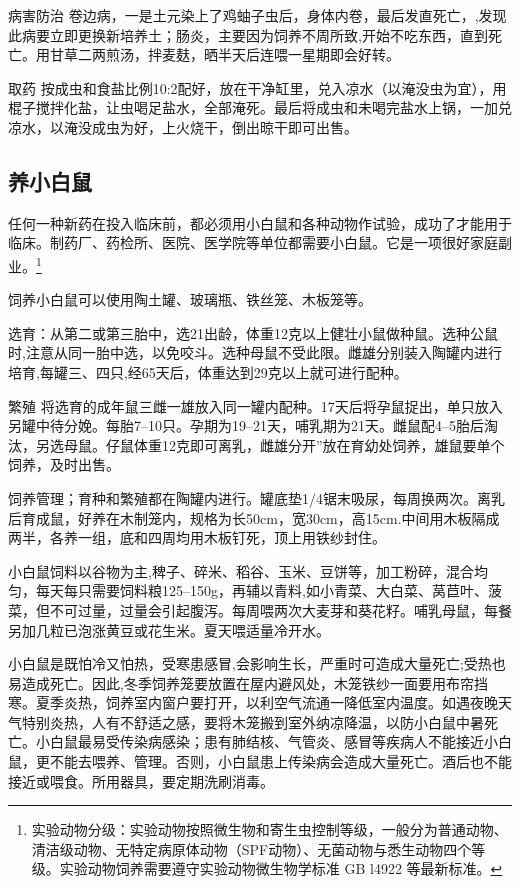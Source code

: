 \documentclass{ctexbook}
\begin{document}
病害防治 卷边病，一是土元染上了鸡蚰子虫后，身体内卷，最后发直死亡，,发现此病要立即更换新培养土；肠炎，主要因为饲养不周所致,开始不吃东西，直到死亡。用甘草二两煎汤，拌麦麸，晒半天后连喂一星期即会好转。

取药 按成虫和食盐比例10:2配好，放在干净缸里，兑入凉水（以淹没虫为宜），用棍子搅拌化盐，让虫喝足盐水，全部淹死。最后将成虫和未喝完盐水上锅，一加兑凉水，以淹没成虫为好，上火烧干，倒出晾干即可出售。
\subsection{养小白鼠}
任何一种新药在投入临床前，都必须用小白鼠和各种动物作试验，成功了才能用于临床。制药厂、药检所、医院、医学院等单位都需要小白鼠。它是一项很好家庭副业。\footnote{实验动物分级：实验动物按照微生物和寄生虫控制等级，一般分为普通动物、清洁级动物、无特定病原体动物（SPF动物）、无菌动物与悉生动物四个等级。实验动物饲养需要遵守实验动物微生物学标准 GB l4922 等最新标准。}

饲养小白鼠可以使用陶土罐、玻璃瓶、铁丝笼、木板笼等。

选育：从第二或第三胎中，选21出龄，体重12克以上健壮小鼠做种鼠。选种公鼠时,注意从同一胎中选，以免咬斗。选种母鼠不受此限。雌雄分别装入陶罐内进行培育,每罐三、四只,经65天后，体重达到29克以上就可进行配种。

繁殖 将选育的成年鼠三雌一雄放入同一罐内配种。17天后将孕鼠捉出，单只放入另罐中待分娩。每胎7--10只。孕期为19--21天，哺乳期为21天。雌鼠配4--5胎后淘汰，另选母鼠。仔鼠体重12克即可离乳，雌雄分开”放在育幼处饲养，雄鼠要单个饲养，及时出售。

饲养管理；育种和繁殖都在陶罐内进行。罐底垫1/4锯末吸尿，每周换两次。离乳后育成鼠，好养在木制笼内，规格为长50cm，宽30cm，高15cm.中间用木板隔成两半，各养一组，底和四周均用木板钉死，顶上用铁纱封住。

小白鼠饲料以谷物为主,稗子、碎米、稻谷、玉米、豆饼等，加工粉碎，混合均匀，每天每只需要饲料粮125--150g，再辅以青料,如小青菜、大白菜、莴苣叶、菠菜，但不可过量，过量会引起腹泻。每周喂两次大麦芽和葵花籽。哺乳母鼠，每餐另加几粒已泡涨黄豆或花生米。夏天喂适量冷开水。

小白鼠是既怕冷又怕热，受寒患感冒,会影响生长，严重时可造成大量死亡;受热也易造成死亡。因此,冬季饲养笼要放置在屋内避风处，木笼铁纱一面要用布帘挡寒。夏季炎热，饲养室内窗户要打开，以利空气流通一降低室内温度。如遇夜晚天气特别炎热，人有不舒适之感，要将木笼搬到室外纳凉降温，以防小白鼠中暑死亡。小白鼠最易受传染病感染；患有肺结核、气管炎、感冒等疾病人不能接近小白鼠，更不能去喂养、管理。否则，小白鼠患上传染病会造成大量死亡。酒后也不能接近或喂食。所用器具，要定期洗刷消毒。
\end{document}

